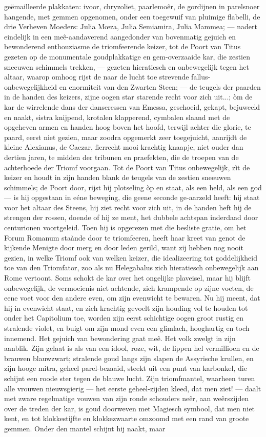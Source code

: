\documentclass[a4paper, 12pt, oneside, dutch]{article}
\begin{document}
geëmailleerde plakkaten: ivoor, chryzoliet, paarlemoêr, de gordijnen in parelsnoer hangende, met gemmen opgenomen, onder een toegewuif van pluimige flabelli, de drie Verheven Moeders: Julia Mœza, Julia Semiamira, Julia Mammea; --- nadert eindelijk in een meê-aandaverend aangedonder van bovenmatig gejuich en bewonderend enthouziasme de triomfeerende keizer, tot de Poort van Titus gezeten op de monumentale goudplakkatige en gem-overzaaide kar, die zestien sneeuwen schimmels trekken, --- gezeten hieratiesch en onbewegelijk tegen het altaar, waarop omhoog rijst de naar de lucht toe strevende fallus-onbewegelijkheid en enormiteit van den Zwarten Steen; --- de teugels der paarden in de handen des keizers, zijne oogen star starende recht voor zich uit...; òm de kar de wirrelende dans der danseressen van Emessa, geschoeid, gekapt, bejuweeld en naakt, sistra knijpend, krotalen klapperend, cymbalen slaand met de opgeheven armen en handen hoog boven het hoofd, terwijl achter die glorie, te paard, eerst niet gezien, maar zoodra opgemerkt zeer toegejuicht, aanrijdt de kleine Alexianus, de Caezar, fierrecht mooi krachtig knaapje, niet ouder dan dertien jaren, te midden der tribunen en praefekten, die de troepen van de achterhoede der Triomf voorgaan. Tot de Poort van Titus onbewegelijk, zìt de keizer en houdt in zijn handen blank de teugels van de zestien sneeuwen schimmels; de Poort door, rijst hij plotseling òp en staat, als een held, als een god --- is hij opgestaan in eéne beweging, die geene seconde ge-aarzeld heeft: hij staat voor het altaar des Steens, hij ziet recht voor zich uit, in de handen heft hij de strengen der rossen, doende of hij ze ment, het dubbele achtspan inderdaad door centurionen voortgeleid. Toen hij is opgerezen met die besliste gratie, om het Forum Romanum staànde door te triomfeeren, heeft haar kreet van genot de kijkende Menigte door merg en door leden gerild, want zij hebben nog nooit gezien, in welke Triomf ook van welken keizer, die idealizeering tot goddelijkheid toe van den Triomfator, zoo als nu Helegabalus zich hieratiesch onbewegelijk aan Rome vertoont. Soms schokt de kar over het ongelijke plaveisel, maar hij blijft onbewegelijk, de vermoeienis niet achtende, zich krampende op zijne voeten, de eene voet voor den andere even, om zijn evenwicht te bewaren. Nu hij meent, dat hij in evenwicht staat, en zich krachtig gevoelt zijn houding vol te houden tot onder het Capitolium toe, worden zijn eerst schichtige oogen groot rustig en stralende violet, en buigt om zijn mond even een glimlach, hooghartig en toch innemend. Het gejuich van bewondering gaat meê. Het volk zwelgt in zijn aanblik. Zijn gelaat is als van een idool, roze, wit, de lippen hel vermillioen en de brauwen blauwzwart; stralende goud langs zijn slapen de Assyrische krullen, en zijn hooge mitra, geheel parel-bezaaid, steekt uit een punt van karbonkel, die schijnt een roode ster tegen de blauwe lucht. Zijn triomfmantel, waarheen turen alle vrouwen nieuwsgierig --- het eerste geheel-zijden kleed, dat men ziet! --- daalt met zware regelmatige vouwen van zijn ronde schouders neêr, aan weêrszijden over de treden der kar, is goud doorweven met Magiesch symbool, dat men niet kent, en tot klokkestijfte en klokkezwaarte omzoomd met een rand van groote gemmen. Onder den mantel schijnt hij naakt, maar 
\end{document}

